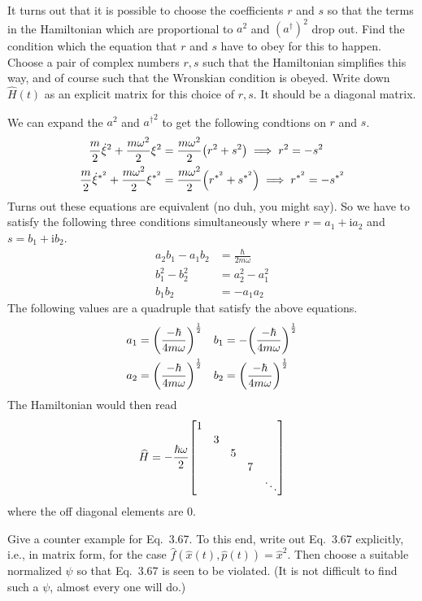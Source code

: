 \documentclass[boxes,pages]{homework}
\makeatletter
\newcommand{\iu}{\mathrm{i}}
\numberwithin{@problem}{section}
\makeatother
\begin{document}
\begin{problem}
It turns out that it is possible to choose the coefficients $r$ and $s$ so that the terms in the Hamiltonian which are proportional to $a^2$ and $(a^\dagger)^2$ drop out. Find the condition which the equation that $r$ and $s$ have to obey for this to happen. Choose a pair of complex numbers $r, s$ such that the Hamiltonian simplifies this way, and of course such that the Wronskian condition is obeyed. Write down $\hat{H}(t)$ as an explicit matrix for this choice of $r, s$. It should be a diagonal matrix.
\end{problem}

\begin{solution}
	We can expand the $a^2$ and ${a^\dagger}^2$ to get the following condtions on $r$ and $s$.
	\begin{align*}
		\frac{m}{2}\dot{\xi}^2 + \frac{m\omega^2}{2}\xi^2           & = \frac{m\omega^2}{2}\qty(r^2 + s^2) \implies r^2 = -s^2                 \\
		\frac{m}{2} \dot{\xi}^{*^2} + \frac{m\omega^2}{2} \xi^{*^2} & = \frac{m\omega^2}{2}\qty(r^{*^2} + s^{*^2}) \implies r^{*^2} = -s^{*^2}
	\end{align*}
	Turns out these equations are equivalent (no duh, you might say). So we have to satisfy the following three conditions simultaneously where $r = a_1 + \iu a_2$ and $s = b_1 + \iu b_2$.
	\begin{align*}
		a_2b_1 - a_1b_2 & = \frac{\hbar}{2m\omega} \\
		b_1^2 -b_2^2    & = a_2^2 - a_1^2          \\
		b_1b_2          & = -a_1a_2
	\end{align*}
	The following values are a quadruple that satisfy the above equations.
	\begin{align*}
		a_1 & = \qty(\frac{-\hbar}{4m\omega})^{\frac{1}{2}} & b_1 & = -\qty(\frac{-\hbar}{4m\omega})^{\frac{1}{2}} \\
		a_2 & = \qty(\frac{-\hbar}{4m\omega})^{\frac{1}{2}} & b_2 & = \qty(\frac{-\hbar}{4m\omega})^{\frac{1}{2}}
	\end{align*}
	The Hamiltonian would then read
	\begin{equation*}
		\widehat{H} = -\frac{\hbar\omega}{2}\mqty[\dmat{1,3,5,7,\ddots}]
	\end{equation*}
	where the off diagonal elements are 0.
\end{solution}

\begin{problem}
Give a counter example for Eq.\ 3.67. To this end, write out Eq.\ 3.67 explicitly, i.e., in matrix form, for the case $\hat{f}(\hat{x}(t), \hat{p}(t)) = \hat{x}^2$. Then choose a suitable normalized $\psi$ so that Eq.\ 3.67 is seen to be violated. (It is not difficult to find such a $\psi$, almost every one will do.)
\end{problem}
\end{document}
